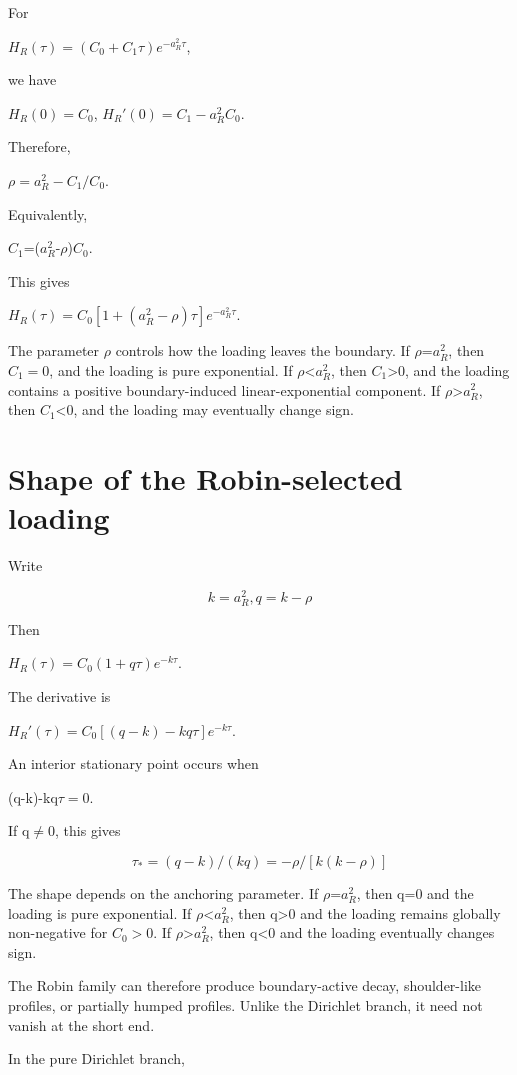 \documentclass[11pt,oneside]{book}
\begin{document}
For

$H_R(\tau)=(C_0+C_1\tau)e^{-a_R^2\tau}$,

we have

$H_R(0)=C_0$, $H_R'(0)=C_1-a_R^2C_0$.

Therefore,

$\rho=a_R^2-C_1/C_0$.

Equivalently,

$C_1$=($a_R^2$-$\rho$)$C_0$.

This gives

$H_R(\tau)=C_0[1+(a_R^2-\rho)\tau]e^{-a_R^2\tau}$.

The parameter $\rho$ controls how the loading leaves the boundary. If
$\rho$=$a_R^2$, then $C_1=0$, and the loading is pure exponential. If
$\rho$\textless $a_R^2$, then $C_1$\textgreater0, and the loading contains a
positive boundary-induced linear-exponential component. If
$\rho$\textgreater $a_R^2$, then $C_1$\textless0, and the loading may eventually
change sign.

\section{Shape of the Robin-selected
loading}\label{shape-of-the-robin-selected-loading}

Write

\[
k=a_R^2, q=k-\rho
\]

Then

$H_R(\tau)=C_0(1+q\tau)e^{-k\tau}$.

The derivative is

$H_R'(\tau)=C_0[(q-k)-kq\tau]e^{-k\tau}$.

An interior stationary point occurs when

(q-k)-kq$\tau=0$.

If q$\neq$0, this gives

\[
\tau_*=(q-k)/(kq) = -\rho/[k(k-\rho)]
\]

The shape depends on the anchoring parameter. If $\rho$=$a_R^2$, then q=0 and
the loading is pure exponential. If $\rho$\textless $a_R^2$, then
q\textgreater0 and the loading remains globally non-negative for
$C_0>0$. If $\rho$\textgreater $a_R^2$, then q\textless0 and the
loading eventually changes sign.

The Robin family can therefore produce boundary-active decay,
shoulder-like profiles, or partially humped profiles. Unlike the
Dirichlet branch, it need not vanish at the short end.

In the pure Dirichlet branch,
\end{document}
